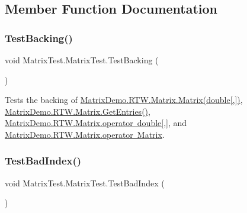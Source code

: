 \subsection{Member Function Documentation}
\mbox{\label{class_matrix_test_1_1_matrix_test_a0e036091518dbda0ebe507b7d45c2fad}} 
\subsubsection{\texorpdfstring{Test\+Backing()}{TestBacking()}}
{\footnotesize\ttfamily void Matrix\+Test.\+Matrix\+Test.\+Test\+Backing (\begin{DoxyParamCaption}{ }\end{DoxyParamCaption})}



Tests the backing of \mbox{\hyperlink{class_matrix_demo_1_1_r_t_w_1_1_matrix_ad2a320fd0c86551f34070679fd43433c}{Matrix\+Demo.\+R\+T\+W.\+Matrix.\+Matrix(double\mbox{[},\mbox{]})}}, \mbox{\hyperlink{class_matrix_demo_1_1_r_t_w_1_1_matrix_a9f6f8e0e7acfbdd55852f258daf68b8f}{Matrix\+Demo.\+R\+T\+W.\+Matrix.\+Get\+Entries()}}, \mbox{\hyperlink{class_matrix_demo_1_1_r_t_w_1_1_matrix_ac23641ac04b3c3baf14174bdf9049db2}{Matrix\+Demo.\+R\+T\+W.\+Matrix.\+operator double\mbox{[},\mbox{]}}}, and \mbox{\hyperlink{class_matrix_demo_1_1_r_t_w_1_1_matrix_a0c737f7e6b54edac4d26b4f1c595ee92}{Matrix\+Demo.\+R\+T\+W.\+Matrix.\+operator Matrix}}. 

\mbox{\label{class_matrix_test_1_1_matrix_test_abe913795621ee7220dbcbc08f38942c7}} 
\subsubsection{\texorpdfstring{Test\+Bad\+Index()}{TestBadIndex()}}
{\footnotesize\ttfamily void Matrix\+Test.\+Matrix\+Test.\+Test\+Bad\+Index (\begin{DoxyParamCaption}{ }\end{DoxyParamCaption})}




